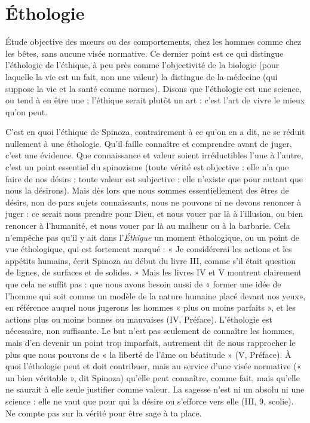 \section{Éthologie}
Étude objective des mœurs ou des comportements, chez les
hommes comme chez les bêtes, sans aucune visée normative.
Ce dernier point est ce qui distingue l’éthologie de l'éthique, à peu près comme
l’objectivité de la biologie (pour laquelle la vie est un fait, non une valeur) la
distingue de la médecine (qui suppose la vie et la santé comme normes). Disons
que l’éthologie est une science, ou tend à en être une ; l'éthique serait plutôt un
art : c’est l’art de vivre le mieux qu’on peut.

C’est en quoi l'éthique de Spinoza, contrairement à ce qu’on en a dit, ne se
réduit nullement à une éthologie. Qu'il faille connaître et comprendre avant de
juger, c’est une évidence. Que connaissance et valeur soient irréductibles l’une
à l’autre, c’est un point essentiel du spinozisme (toute vérité est objective : elle
n’a que faire de nos désirs ; toute valeur est subjective : elle n’existe que pour
autant que nous la désirons). Mais dès lors que nous sommes essentiellement
des êtres de désirs, non de purs sujets connaissants, nous ne pouvons ni ne
devons renoncer à juger : ce serait nous prendre pour Dieu, et nous vouer par
là à l'illusion, ou bien renoncer à l'humanité, et nous vouer par là au malheur
ou à la barbarie. Cela n'empêche pas qu’il y ait dans l’{\it Éthique} un moment éthologique,
ou un point de vue éthologique, qui est fortement marqué : « Je considérerai
les actions et les appétits humains, écrit Spinoza au début du livre III,
comme s’il était question de lignes, de surfaces et de solides. » Mais les livres IV
et V montrent clairement que cela ne suffit pas : que nous avons besoin aussi
de « former une idée de l’homme qui soit comme un modèle de la nature
humaine placé devant nos yeux», en référence auquel nous jugerons les
hommes « plus ou moins parfaits », et les actions plus ou moins bonnes ou
mauvaises (IV, Préface). L’éthologie est nécessaire, non suffisante. Le but n’est
pas seulement de connaître les hommes, mais d’en devenir un point trop
imparfait, autrement dit de nous rapprocher le plus que nous pouvons de « la
liberté de l’âme ou béatitude » (V, Préface). À quoi l’éthologie peut et doit
contribuer, mais au service d’une visée normative (« un bien véritable », dit Spinoza)
qu’elle peut connaître, comme fait, mais qu’elle ne saurait à elle seule justifier
comme valeur. La sagesse n’est ni un absolu ni une science : elle ne vaut
que pour qui la désire ou s’efforce vers elle (III, 9, scolie). Ne compte pas sur la
vérité pour être sage à ta place.

